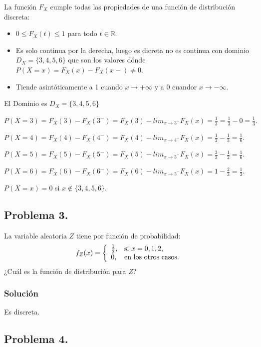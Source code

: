 \documentclass[
]{article}
\providecommand{\tightlist}{%
  \setlength{\itemsep}{0pt}\setlength{\parskip}{0pt}}
\begin{document}
La función \(F_X\) cumple todas las propiedades de una función de
distribución discreta:

\begin{itemize}
\tightlist
\item
  \(0\leq F_X(t)\leq 1\) para todo \(t\in \mathbb{R}.\)
\item
  Es solo continua por la derecha, luego es dicreta no es continua con
  dominio \(D_X=\{3,4,5,6\}\) que son los valores dónde
  \(P(X=x)=F_X(x)-F_X(x-)\not=0\).
\item
  Tiende asintóticamente a 1 cuando \(x\to+\infty\) y a 0 cuandor
  \(x\to-\infty\).
\end{itemize}

El Dominio es \(D_X=\{3,4,5,6\}\)

\(P(X=3)=F_X(3)-F_X(3^{-})=F_X(3)-lim_{x\to 3^{-}} F_X(x)=\frac{1}{3}=\frac{1}{3}-0=\frac{1}{3}.\)

\(P(X=4)=F_X(4)-F_X(4^{-})=F_X(4)-lim_{x\to 4^{-}} F_X(x)=\frac{1}{2}-\frac{1}{3}=\frac{1}{6}.\)

\(P(X=5)=F_X(5)-F_X(5^{-})=F_X(5)-lim_{x\to 5^{-}} F_X(x)=\frac{2}{3}-\frac{1}{2}=\frac{1}{6}.\)

\(P(X=6)=F_X(6)-F_X(6^{-})=F_X(6)-lim_{x\to 5^{-}} F_X(x)=1-\frac{2}{3}=\frac{1}{3}.\)

\(P(X=x)=0\) si \(x \not\in\{3,4,5,6\}.\)

\hypertarget{problema-3.}{%
\subsection{Problema 3.}\label{problema-3.}}

La variable aleatoria \(Z\) tiene por función de probabilidad:
\[f_Z (x)=
\left\{\begin{array}{ll}
{1\over 3}, & \mbox{si $x=0,1,2$},\\ 0, & \mbox{en los otros
casos.}
\end{array}\right.
\] ¿Cuál es la función de distribución para \(Z\)?

\hypertarget{soluciuxf3n-2}{%
\subsubsection{Solución}\label{soluciuxf3n-2}}

Es discreta.

\hypertarget{problema-4.}{%
\subsection{Problema 4.}\label{problema-4.}}
\end{document}
